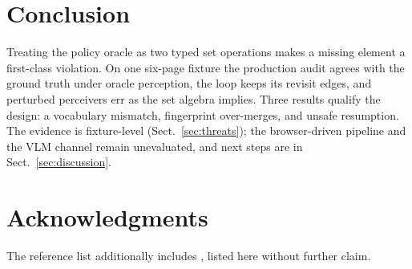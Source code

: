 \section{Conclusion}
\label{sec:conclusion}

 Treating the policy oracle as two typed set operations makes a missing element
a first-class violation. On one six-page fixture the production audit agrees with
the ground truth under oracle perception, the loop keeps its revisit edges, and
perturbed perceivers err as the set algebra implies. Three results qualify the design: a
vocabulary mismatch, fingerprint over-merges, and unsafe resumption. The evidence is fixture-level
(Sect.~\ref{sec:threats}); the browser-driven pipeline and the VLM channel remain
unevaluated, and next steps are in Sect.~\ref{sec:discussion}.

\section*{Acknowledgments}
The reference list additionally includes \cite{sridhar2025cloud,sathiya2025stress},
listed here without further claim.
